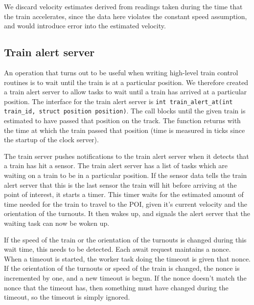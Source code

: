 \documentclass[titlepage]{article}
\begin{document}
We discard velocity estimates derived from readings taken during the time
that the train accelerates, since the data here violates the constant speed
assumption, and would introduce error into the estimated velocity.

\subsection{Train alert server}
An operation that turns out to be useful when writing high-level train control
routines is to wait until the train is at a particular position.
We therefore created a train alert server to allow tasks to wait until a train
has arrived at a particular position.
The interface for the train alert server is
\texttt{int train\_alert\_at(int train\_id, struct position position)}.
The call blocks until the given train is estimated to have passed that position
on the track.
The function returns with the time at which the train passed that position
(time is measured in ticks since the startup of the clock server).

The train server pushes notifications to the train alert server when
it detects that a train has hit a sensor.
The train alert server has a list of tasks which are waiting on a train
to be in a particular position.
If the sensor data tells the train alert server that this is the last
sensor the train will hit before arriving at the point of interest,
it starts a timer.
This timer waits for the estimated amount of time needed for the train
to travel to the POI, given it's current velocity and the orientation
of the turnouts.
It then wakes up, and signals the alert server that the waiting task can
now be woken up.

If the speed of the train or the orientation of the turnouts is changed
during this wait time, this needs to be detected.
Each await request maintains a nonce.
When a timeout is started, the worker task doing the timeout is given
that nonce.
If the orientation of the turnouts or speed of the train is changed,
the nonce is incremented by one, and a new timeout is begun.
If the nonce doesn't match the nonce that the timeout has, then something
must have changed during the timeout, so the timeout is simply ignored.


\end{document}
